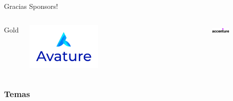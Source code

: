 \documentclass{beamer}
\begin{document}
\begin{frame}{Gracias Sponsors!}
\begin{columns}[t]
    \end{columns}
    \begin{columns}[t]
        \centering
        Gold\\
        \begin{minipage}{0.5\textwidth}
            \centering
            \includegraphics[width=0.4\textwidth,keepaspectratio]{logos/avature.jpg}
        \end{minipage}%
        \begin{minipage}{0.5\textwidth}
            \centering
            \includegraphics[width=0.4\textwidth,keepaspectratio]{logos/Acc_Logo_Black_Purple_RGB.png}
        \end{minipage}
    \end{columns}
\end{frame}


\begin{frame}
\frametitle{Temas}
\tableofcontents
\end{frame}
\end{document}
